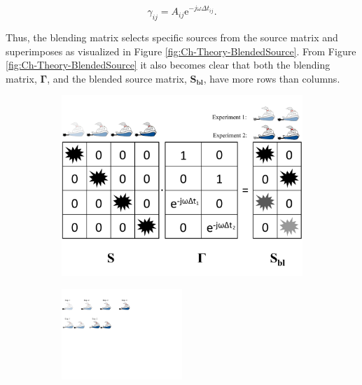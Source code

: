 \begin{equation}
	\gamma_{ij} =  A_{ij} \mathrm{e}^{-j \omega \Delta t_{ij}}.
	\label{eq:Ch-Theory-BlendingElement}
\end{equation} 

Thus, the blending matrix selects specific sources from the source matrix and superimposes as visualized in Figure \ref{fig:Ch-Theory-BlendedSource}. From Figure \ref{fig:Ch-Theory-BlendedSource} it also becomes clear that both the blending matrix, $\mathbf{\Gamma}$, and the blended source matrix, $\mathbf{S_{bl}}$, have more rows than columns. 

\begin{figure}
	
	\centering
	\begin{subfigure}[t]{0.6\textwidth}	
	\includegraphics[width=\textwidth]{Plots/Blended-Source-edit2}
	\caption{}
	\label{fig:Ch-Theory-BlendedSource-Matrices}
	\end{subfigure}
	\par\bigskip
	\begin{subfigure}[t]{\textwidth}
	\centering
	\includegraphics[width=0.5\textwidth]{Plots/Blended-Source-Conventional}

\end{subfigure}
\end{figure}
